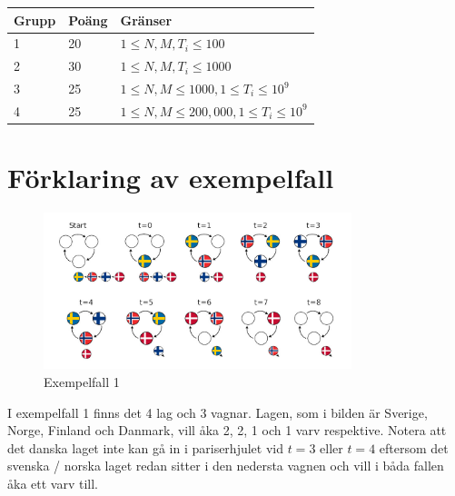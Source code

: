 \noindent
\begin{tabular}{| l | l | l |}
\hline
Grupp & Poäng & Gränser \\ \hline
1     & 20    & $1 \le N, M, T_i \le 100$ \\ \hline
2     & 30    & $1 \le N, M, T_i \le 1000$ \\ \hline
3     & 25    & $1 \le N, M \le 1000, 1 \le T_i \le 10^9$ \\ \hline
4     & 25    & $1 \le N, M \le 200,000, 1 \le T_i \le 10^9$ \\ \hline
\end{tabular}

\section*{Förklaring av exempelfall}

\begin{figure}[h]
\includegraphics[width=0.8\textwidth]{sample1}
\caption{Exempelfall 1}
\end{figure}

I exempelfall 1 finns det 4 lag och 3 vagnar.
Lagen, som i bilden är Sverige, Norge, Finland och Danmark, vill åka 2, 2, 1 och 1 varv respektive.
Notera att det danska laget inte kan gå in i pariserhjulet vid $t=3$ eller $t=4$
eftersom det svenska / norska laget redan sitter i den nedersta vagnen och vill i båda fallen åka ett varv till.
